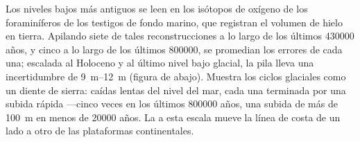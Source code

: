 Los niveles bajos más antiguos se leen en los isótopos de oxígeno de los foraminíferos de los testigos de fondo marino, que registran el volumen de hielo en tierra. Apilando siete de tales
reconstrucciones a lo largo de los últimos \num{430000} años, y cinco a lo largo de los últimos \num{800000}, se promedian los errores de cada una; escalada al Holoceno y al último nivel bajo glacial, la pila lleva
una incertidumbre de \qtyrange{9}{12}{m} (figura de abajo). Muestra los ciclos glaciales como un diente de sierra: caídas lentas del nivel del mar, cada una terminada por una subida rápida ---cinco veces en los
últimos \num{800000} años, una subida de más de \qty{100}{m} en menos de \num{20000} años. La  a esta escala mueve la línea de costa de un lado a otro de las plataformas continentales.

